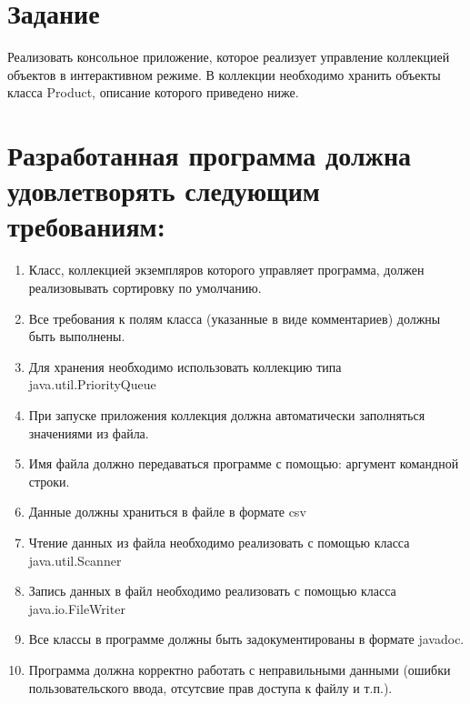 \documentclass{article}
\begin{document}
\itmo[
  variant=74273,
  labn=1,
  discipline=Программирование,
  group=P3115,
  student=Владимир Мацюк,
  teacher=Кустарев Иван Павлович,
  year=2023,
  logo=../../../lib/img/itmo.png
]

\section*{Задание}

Реализовать консольное приложение, которое реализует управление коллекцией объектов в интерактивном режиме. В коллекции необходимо хранить объекты класса Product, описание которого приведено ниже.

\section*{Разработанная программа должна удовлетворять следующим требованиям:}
\begin{enumerate}
  \item Класс, коллекцией экземпляров которого управляет программа, должен реализовывать сортировку по умолчанию.
  \item Все требования к полям класса (указанные в виде комментариев) должны быть выполнены.
  \item Для хранения необходимо использовать коллекцию типа java.util.PriorityQueue
  \item При запуске приложения коллекция должна автоматически заполняться значениями из файла.
  \item Имя файла должно передаваться программе с помощью: аргумент командной строки.
  \item Данные должны храниться в файле в формате csv
  \item Чтение данных из файла необходимо реализовать с помощью класса java.util.Scanner
  \item Запись данных в файл необходимо реализовать с помощью класса java.io.FileWriter
  \item Все классы в программе должны быть задокументированы в формате javadoc.
  \item Программа должна корректно работать с неправильными данными (ошибки пользовательского ввода, отсутсвие прав доступа к файлу и т.п.).
\end{enumerate}
\end{document}

